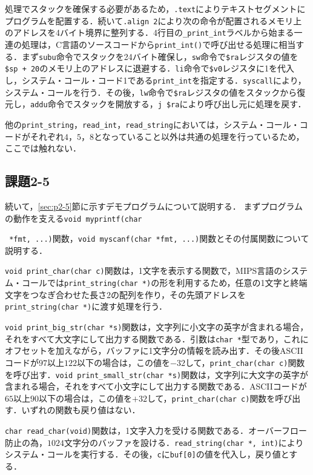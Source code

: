 処理でスタックを確保する必要があるため，\verb|.text|によりテキストセグメントにプログラムを配置する．続いて\verb|.align 2|により次の命令が配置されるメモリ上のアドレスを4バイト境界に整列する．4行目の\verb|_print_int|ラベルから始まる一連の処理は，C言語のソースコードから\verb|print_int()|で呼び出せる処理に相当する．まず\verb|subu|命令でスタックを24バイト確保し，\verb|sw|命令で\verb|$ra|レジスタの値を\verb|$sp + 20|のメモリ上のアドレスに退避する．\verb|li|命令で\verb|$v0|レジスタに1を代入し，システム・コール・コード1である\verb|print_int|を指定する．\verb|syscall|により，システム・コールを行う．その後，\verb|lw|命令で\verb|$ra|レジスタの値をスタックから復元し，\verb|addu|命令でスタックを開放する，\verb|j $ra|により呼び出し元に処理を戻す．

他の\verb|print_string|，\verb|read_int|，\verb|read_string|においては，システム・コール・コードがそれぞれ$4$，$5$，$8$となっていること以外は共通の処理を行っているため，ここでは触れない．



\subsection{課題2-5}
続いて，\ref{sec:p2-5}節に示すデモプログラムについて説明する．
まずプログラムの動作を支える\verb|void myprintf(char|

\noindent\verb| *fmt, ...)|関数，\verb|void myscanf(char *fmt, ...)|関数とその付属関数について説明する．

\verb|void print_char(char c)|関数は，1文字を表示する関数で，MIPS言語のシステム・コールでは\verb|print_string(char *)|の形を利用するため，任意の1文字と終端文字をつなぎ合わせた長さ2の配列を作り，その先頭アドレスを\verb|print_string(char *)|に渡す処理を行う．

\verb|void print_big_str(char *s)|関数は，文字列に小文字の英字が含まれる場合，それをすべて大文字にして出力する関数である．引数は\verb|char *|型であり，これにオフセットを加えながら，バッファに1文字分の情報を読み出す．その後ASCIIコードが$97$以上$122$以下の場合は，この値を$-32$して，\verb|print_char(char c)|関数を呼び出す．\verb|void print_small_str(char *s)|関数は，文字列に大文字の英字が含まれる場合，それをすべて小文字にして出力する関数である．ASCIIコードが$65$以上$90$以下の場合は，この値を$+32$して，\verb|print_char(char c)|関数を呼び出す．いずれの関数も戻り値はない．

\verb|char read_char(void)|関数は，1文字入力を受ける関数である．オーバーフロー防止の為，$1024$文字分のバッファを設ける．\verb|read_string(char *, int)|によりシステム・コールを実行する．その後，\verb|c|に\verb|buf[0]|の値を代入し，戻り値とする．

